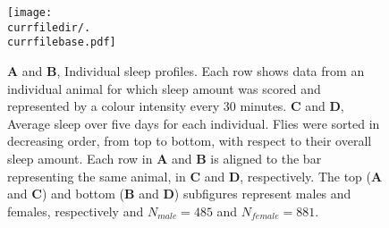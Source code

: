 \begin{figure}[h!]
	\centering   
		\begin{minipage}[t]{0.5\textwidth}
		\vspace{0pt}
		\texttt{[image: \\currfiledir/.\\currfilebase.pdf]}
	\end{minipage}\hfill
	\begin{minipage}[t]{0.45\textwidth}
		\vspace{0pt}
		\caption[Sleep distribution]{
	    \textbf{A} and \textbf{B}, Individual sleep profiles. Each row shows data from an individual animal for which sleep amount was scored and represented by 
	    a colour intensity every 30 minutes.
		\textbf{C} and \textbf{D}, Average sleep over five days for each individual.
		Flies were sorted in decreasing order, from top to bottom, with respect to their overall sleep amount.
		Each row in \textbf{A} and \textbf{B} is aligned to the bar representing the same animal, in \textbf{C} and \textbf{D}, respectively.
		The top (\textbf{A} and \textbf{C}) and bottom (\textbf{B} and \textbf{D}) subfigures represent males and females, respectively and $N_{male} = 485$ and $N_{female} = 881$.
		\label{fig:\currfilebase}
		}
	\end{minipage}
\end{figure}
